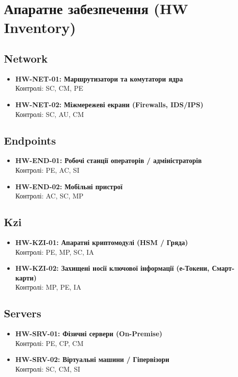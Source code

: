 \documentclass{article}
\begin{document}
\newpage
\section{Апаратне забезпечення (HW Inventory)}
\subsection{Network}
\begin{itemize}
\item \textbf{HW-NET-01: Маршрутизатори та комутатори ядра}
\\ Контролі: SC, CM, PE
\item \textbf{HW-NET-02: Міжмережеві екрани (Firewalls, IDS/IPS)}
\\ Контролі: SC, AU, CM
\end{itemize}
\subsection{Endpoints}
\begin{itemize}
\item \textbf{HW-END-01: Робочі станції операторів / адміністраторів}
\\ Контролі: PE, AC, SI
\item \textbf{HW-END-02: Мобільні пристрої}
\\ Контролі: AC, SC, MP
\end{itemize}
\subsection{Kzi}
\begin{itemize}
\item \textbf{HW-KZI-01: Апаратні криптомодулі (HSM / Гряда)}
\\ Контролі: PE, MP, SC, IA
\item \textbf{HW-KZI-02: Захищені носії ключової інформації (е-Токени, Смарт-карти)}
\\ Контролі: MP, PE, IA
\end{itemize}
\subsection{Servers}
\begin{itemize}
\item \textbf{HW-SRV-01: Фізичні сервери (On-Premise)}
\\ Контролі: PE, CP, CM
\item \textbf{HW-SRV-02: Віртуальні машини / Гіпервізори}
\\ Контролі: SC, CM, SI
\end{itemize}
\end{document}
